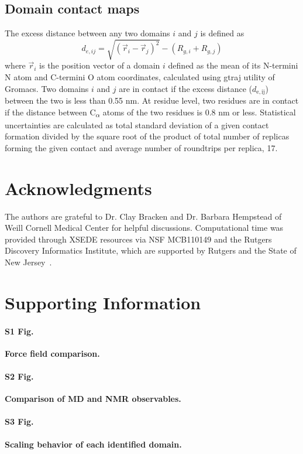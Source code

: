\documentclass[10pt,letterpaper]{article}
\begin{document}
\subsection*{Domain contact maps}
The excess distance between any two domains $i$ and $j$ is defined as \begin{equation}d_{e,ij} = \sqrt{(\vec{r}_i - \vec{r}_j)^2} - (R_{g,i}+R_{g,j})\label{eq:overlap2}\end{equation} where $\vec{r}_i$ is the position vector of a domain $i$ defined as the mean of its N-termini N atom and C-termini O atom coordinates, calculated using g\textunderscore traj utility of Gromacs. Two domains $i$ and $j$ are in contact if the excess distance ($d_{\mathrm{e,ij}}$) between the two is less than 0.55 nm. At residue level, two residues are in contact if the distance between C\textsubscript{$\alpha$} atoms of the two residues is 0.8 nm or less.
Statistical uncertainties are calculated as total standard deviation of a given contact formation divided by the square root of the product of total number of replicas forming the given contact and average number of roundtrips per replica, 17.

\section*{Acknowledgments}
The authors are grateful to Dr. Clay Bracken and Dr. Barbara Hempstead of Weill Cornell Medical Center for helpful discussions. Computational time was provided through XSEDE resources via NSF MCB110149 and the Rutgers Discovery Informatics Institute, which are supported by Rutgers and the State of New Jersey~\cite{Parashar2018}.

\section*{Supporting Information}

\paragraph*{S1 Fig.}
\label{S1_Fig}
{\bf Force field comparison.} 

\paragraph*{S2 Fig.}
\label{S2_Fig}
{\bf Comparison of MD and NMR observables.} 

\paragraph*{S3 Fig.}
\label{S3_Fig}
{\bf Scaling behavior of each identified domain.} 
\end{document}
